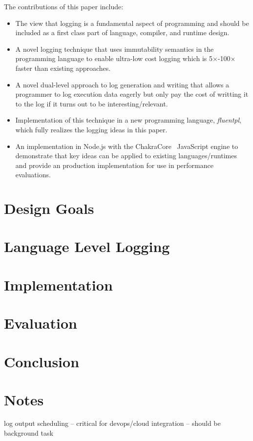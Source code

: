 \documentclass[preprint]{sig-alternate-05-2015}
\begin{document}
\noindent
The contributions of this paper include:
\begin{itemize}
\item The view that logging is a fundamental aspect of programming and should be
included as a first class part of language, compiler, and runtime design.

\item A novel logging technique that uses immutability semantics in the
programming language to enable ultra-low cost logging which is
5$\times$-100$\times$ faster than existing approaches.

\item A novel dual-level approach to log generation and writing that allows a
programmer to log execution data eagerly but only pay the cost of writting it to
the log if it turns out to be interesting/relevant.

\item Implementation of this technique in a new programming language,
\emph{fluentpl}, which fully realizes the logging ideas in this paper. 

\item An implementation in Node.js with the ChakraCore~\cite{NodeChakraCore} 
JavaScript engine to demonstrate that key ideas can be applied to existing
languages/runtimes and provide an production implementation for use in
performance evaluations.
\end{itemize}

\section{Design Goals}
\label{sec:design}


\section{Language Level Logging}

\section{Implementation}

\section{Evaluation}

\section{Conclusion}

\section{Notes} log output scheduling -- critical for devops/cloud integration
-- should be background task


\balance

{
\raggedright 


 
}
\end{document}
